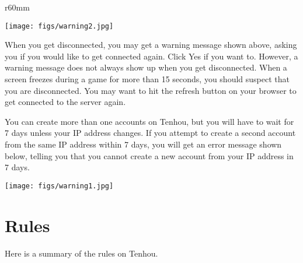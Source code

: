 \begin{wrapfigure}{r}{60mm}
\vspace{-10pt}
\begin{center}
\texttt{[image: figs/warning2.jpg]}
\end{center}
\vspace{-10pt}
\end{wrapfigure}

\bigskip
When you get disconnected, you may get a warning message shown above, asking you if you would like to get connected again. Click Yes if you want to. However, a warning message does not always show up when you get disconnected. When a screen freezes during a game for more than 15 seconds, you should suspect that you are disconnected. You may want to hit the refresh button on your browser to get connected to the server again. 

\bigskip
You can create more than one accounts on {\jap Tenhou}, but you will have to wait for 7 days unless your IP address changes. If you attempt to create a second account from the same IP address within 7 days, you will get an error message shown below, telling you that you cannot create a new account from your IP address in 7 days. 

\begin{center}
\texttt{[image: figs/warning1.jpg]}
\end{center}

\section{Rules}
Here is a summary of the rules on {\jap Tenhou}. 

